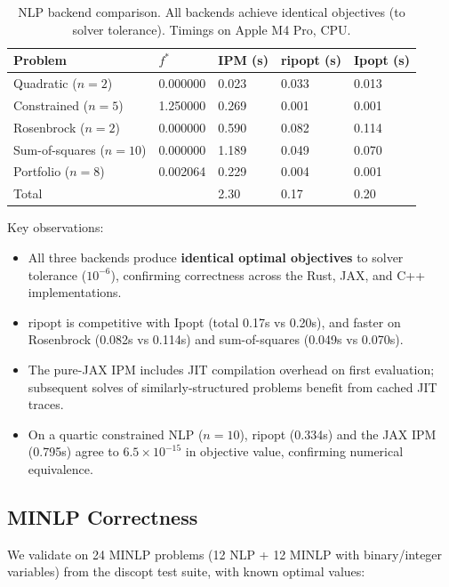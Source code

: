 \documentclass[12pt,preprint]{article}
\begin{document}
\begin{table}[htbp]
\centering
\begin{tabular}{lllll}
\toprule
Problem & $f^*$ & IPM (s) & ripopt (s) & Ipopt (s) \\
\midrule
Quadratic ($n=2$) & 0.000000 & 0.023 & 0.033 & 0.013 \\
Constrained ($n=5$) & 1.250000 & 0.269 & 0.001 & 0.001 \\
Rosenbrock ($n=2$) & 0.000000 & 0.590 & 0.082 & 0.114 \\
Sum-of-squares ($n=10$) & 0.000000 & 1.189 & 0.049 & 0.070 \\
Portfolio ($n=8$) & 0.002064 & 0.229 & 0.004 & 0.001 \\
\midrule
Total &  & 2.30 & 0.17 & 0.20 \\
\bottomrule
\end{tabular}
\caption{NLP backend comparison. All backends achieve identical objectives (to solver tolerance). Timings on Apple M4 Pro, CPU.}
\label{tab-nlp-backends}
\end{table}


Key observations:


\begin{itemize}
\item All three backends produce \textbf{identical optimal objectives} to solver tolerance ($10^{-6}$), confirming correctness across the Rust, JAX, and C++ implementations.

\item ripopt is competitive with Ipopt (total 0.17s vs 0.20s), and faster on Rosenbrock (0.082s vs 0.114s) and sum-of-squares (0.049s vs 0.070s).

\item The pure-JAX IPM includes JIT compilation overhead on first evaluation; subsequent solves of similarly-structured problems benefit from cached JIT traces.

\item On a quartic constrained NLP ($n=10$), ripopt (0.334s) and the JAX IPM (0.795s) agree to $6.5 \times 10^{-15}$ in objective value, confirming numerical equivalence.

\end{itemize}

\subsection{MINLP Correctness}
\label{org-minlp-correctness}
We validate on 24 MINLP problems (12 NLP + 12 MINLP with binary/integer variables) from the discopt test suite, with known optimal values:
\end{document}
